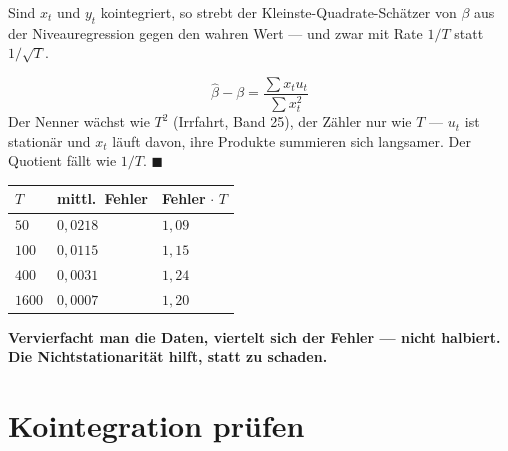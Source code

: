 \begin{merksatz}
Sind $x_t$ und $y_t$ kointegriert, so strebt der Kleinste-Quadrate-Schätzer von $\beta$ aus der Niveauregression gegen den wahren Wert --- und zwar mit Rate $1/T$ statt $1/\sqrt T$.

\[ \hat\beta - \beta = \frac{\sum x_tu_t}{\sum x_t^{2}} \]
Der Nenner wächst wie $T^{2}$ (Irrfahrt, Band 25), der Zähler nur wie $T$ --- $u_t$ ist stationär und $x_t$ läuft davon, ihre Produkte summieren sich langsamer. Der Quotient fällt wie $1/T$. $\blacksquare$

\begin{center}
{\small
\renewcommand{\arraystretch}{1.48}
\begin{tabular}{@{}P{1.6cm}P{2.6cm}P{2.4cm}@{}}
\toprule
$T$ & \textbf{mittl.\ Fehler} & \textbf{Fehler}$\,\cdot\,T$\\
\midrule
$50$ & $0{,}0218$ & $1{,}09$\\
$100$ & $0{,}0115$ & $1{,}15$\\
$400$ & $0{,}0031$ & $1{,}24$\\
$1600$ & $0{,}0007$ & $1{,}20$\\
\bottomrule
\end{tabular}}
\end{center}

\begin{center}
\begin{minipage}{0.9\textwidth}
\textbf{Vervierfacht man die Daten, viertelt sich der Fehler --- nicht halbiert. Die Nichtstationarität hilft, statt zu schaden.}
\end{minipage}
\end{center}

\begin{center}
\begin{minipage}{0.88\textwidth}
\end{minipage}
\end{center}
\end{merksatz}

\section{Kointegration prüfen}

